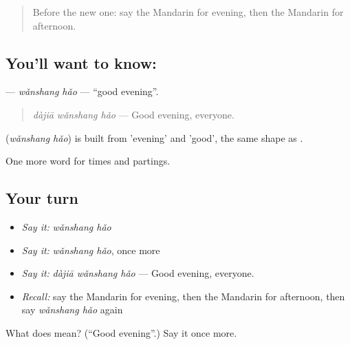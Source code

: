 \label{lesson:ZH-C49-wanshanghao}



\begin{quote}
Before the new one: say the Mandarin for evening, then the Mandarin for afternoon.
\end{quote}

\subsection*{You'll want to know: }
\textbf{} — \emph{wǎnshang hǎo} — \textquotedblleft{}good evening\textquotedblright{}.

\begin{quote}
\textbf{} \emph{dàjiā wǎnshang hǎo} — Good evening, everyone.
\end{quote}

\begin{cousinweb}
\textbf{} (\emph{wǎnshang hǎo}) is built from  'evening' and  'good', the same shape as .
\end{cousinweb}

\begin{grammarlens}[title={What you've built}]
One more word for times and partings.
\end{grammarlens}

\subsection*{Your turn}
\begin{itemize}
\raggedright
  \item \emph{Say it:} \emph{wǎnshang hǎo}
  \item \emph{Say it:} \emph{wǎnshang hǎo}, once more
  \item \emph{Say it:} \emph{dàjiā wǎnshang hǎo} — Good evening, everyone.
  \item \emph{Recall:} say the Mandarin for evening, then the Mandarin for afternoon, then say \emph{wǎnshang hǎo} again
\end{itemize}

\begin{tcolorbox}[breakable,colback=teal!4,colframe=teal!35!black,title={Before you move on}]
What does  mean? (\textquotedblleft{}Good evening\textquotedblright{}.) Say it once more.
\end{tcolorbox}

